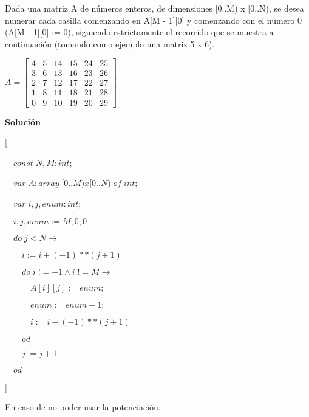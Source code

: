 \documentclass[hidelinks]{article}
\begin{document}
Dada una matriz A de números enteros, de dimensiones [0..M) x [0..N), se desea
numerar cada casilla comenzando en A[M - 1][0] y comenzando con el número 0
(A[M - 1][0] := 0), siguiendo estrictamente el recorrido que se muestra a
continuación (tomando como ejemplo una matriz 5 x 6).

$A=\begin{bmatrix}
		4 & 5 & 14 & 15 & 24 & 25 \\
		3 & 6 & 13 & 16 & 23 & 26 \\
		2 & 7 & 12 & 17 & 22 & 27 \\
		1 & 8 & 11 & 18 & 21 & 28 \\
		0 & 9 & 10 & 19 & 20 & 29
	\end{bmatrix}$

\vspace{2em}

\textbf{Solución} \par

[ \par
$\quad const \; N, M : int$; \par
$\quad var \; A : array \; [0..M)x[0..N) \; of \; int$; \par
			$\quad var \; i,j, enum : int$; \par
			$\quad i, j, enum := M, 0, 0 $ \par
			$\quad do \; j < N \rightarrow $ \par
			$\qquad i := i + (-1)**(j+1) $ \par
			$\qquad do \; i \; != -1 \land i \; != M \rightarrow $ \par
			$\qquad \quad A[i][j] := enum; $ \par
			$\qquad \quad enum := enum + 1; $ \par
			$\qquad \quad i := i + (-1)**(j+1) $ \par
			$\qquad od $ \par
			$\qquad j := j + 1$ \par
			$\quad od$ \par
		] \par

	\newpage

	En caso de no poder usar la potenciación. \par
\end{document}
